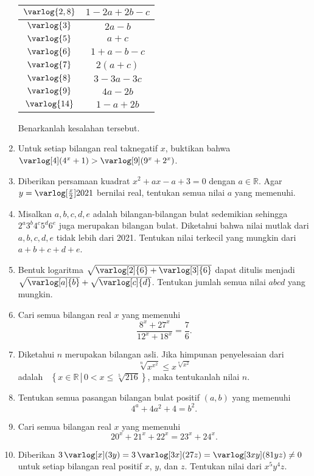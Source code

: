 \documentclass[12pt]{article}
\newcommand*\func[2]{\mathop{}\!{#1}{\left({#2}\right)}}
\newcommand*\set[2]{\mathop{}\!\left\lbrace{{#1} \, \left|\, {#2}\right.}\right\rbrace}
\let\log\varlog
\begin{document}
\begin{enumerate}[leftmargin=*]
\begin{center}
\begin{tabular}{|c|c|}
				\hline
				$ \log{2,8} $ & $ 1 - 2a + 2b - c $ \\
				\hline
				$ \log{3} $ & $ 2a - b $ \\
				\hline
				$ \log{5} $ & $ a + c $ \\
				\hline
				$ \log{6} $ & $ 1 + a - b - c $ \\
				\hline
				$ \log{7} $ & $ 2\left(a + c\right) $ \\
				\hline
				$ \log{8} $ & $ 3 - 3a - 3c $ \\
				\hline
				$ \log{9} $ & $ 4a - 2b $ \\
				\hline
				$ \log{14} $ & $ 1 - a + 2b $ \\
				\hline
			\end{tabular}
		\end{center}
		Benarkanlah kesalahan tersebut.
		\item Untuk setiap bilangan real taknegatif $ x $, buktikan bahwa $ \func{\log[4]}{4^{x} + 1} > \func{\log[9]}{9^{x} + 2^{x}} $.
		\item Diberikan persamaan kuadrat $ x^{2} + ax - a + 3 = 0 $ dengan $ a \in \mathbb{R} $. Agar $ y = \log[\frac{x}{2}]{2021} $ bernilai real, tentukan semua nilai $ a $ yang memenuhi.
		\item Misalkan $ a, b, c, d, e $ adalah bilangan-bilangan bulat sedemikian sehingga $ 2^{a}3^{b}4^{c}5^{d}6^{e} $ juga merupakan bilangan bulat. Diketahui bahwa nilai mutlak dari $ a, b, c, d, e $ tidak lebih dari 2021. Tentukan nilai terkecil yang mungkin dari $ a + b + c + d + e $.
		\item Bentuk logaritma $ \sqrt{\log[2]{6} + \log[3]{6}} $ dapat ditulis menjadi $ \sqrt{\log[a]{b}} + \sqrt{\log[c]{d}} $. Tentukan jumlah semua nilai $ abcd $ yang mungkin.
		\item Cari semua bilangan real $ x $ yang memenuhi
		\[ \frac{8^{x} + 27^{x}}{12^{x} + 18^{x}} = \frac{7}{6}. \]
		\item Diketahui $ n $ merupakan bilangan asli. Jika himpunan penyelesaian dari
		\[ \sqrt[n]{x^{x^{2}}} \leq x^{\sqrt[n]{x^{2}}} \]
		adalah $ \set{x \in \mathbb{R}}{0 < x \leq \sqrt[5]{216}} $, maka tentukanlah nilai $ n $.
		\item Tentukan semua pasangan bilangan bulat positif $ \left(a, b\right) $ yang memenuhi
		\[ 4^{a} + 4a^{2} + 4 = b^{2}. \]
		\item Cari semua bilangan real $ x $ yang memenuhi
		\[ 20^{x} + 21^{x} + 22^{x} = 23^{x} + 24^{x}. \]
		\item Diberikan $ 3\func{\log[x]}{3y} = 3\func{\log[3x]}{27z} = \func{\log[3xy]}{81yz} \ne 0 $ untuk setiap bilangan real positif $ x $, $ y $, dan $ z $. Tentukan nilai dari $ x^{5}y^{4}z $.

\end{enumerate}
\end{document}
